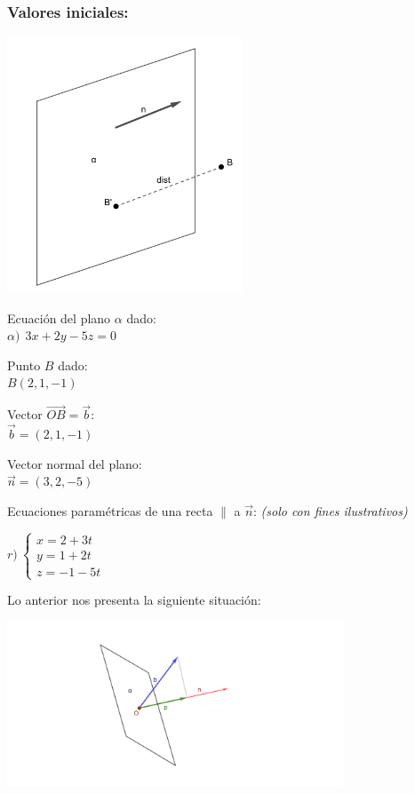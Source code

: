 \subsubsection*{Valores iniciales:}
\begin{multicols}{2}
	\includegraphics[width=7cm, scale=0.8]{ej-18/18ini.png}

	\noindent Ecuación del plano $\alpha$ dado: \\
	\indent $\alpha) \ \ 3x + 2y -5z = 0$

	\noindent Punto $B$ dado: \\
	\indent $B(2, 1, -1)$

	\noindent Vector $\overrightarrow{OB} = \vec{b}$: \\
	\indent $\vec{b} = (2, 1, -1)$

	\noindent Vector normal del plano: \\
	\indent $\vec{n}=(3, 2, -5)$

	\noindent Ecuaciones paramétricas de una recta $\parallel$ a $\vec{n}$: \textit{(solo con fines ilustrativos)}

	$r) \ \begin{cases}
			x = 2 + 3t \\
			y = 1 + 2t \\
			z = -1 - 5t
		\end{cases}$
\end{multicols}

\noindent Lo anterior nos presenta la siguiente situación:

\begin{center}
	\includegraphics[width=10cm, scale=0.8]{ej-18/18ini2.png}
\end{center}

